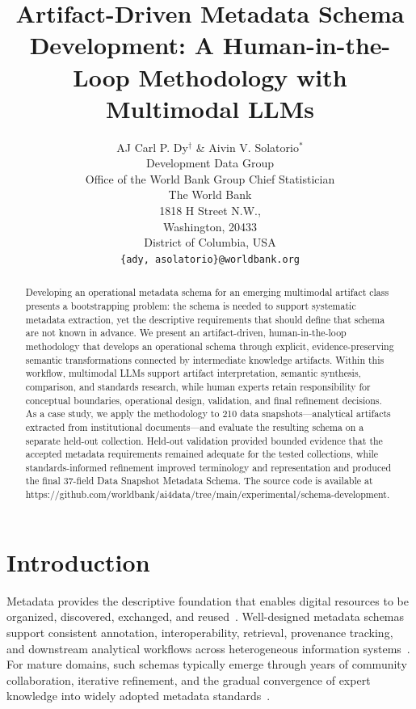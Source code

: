 \documentclass{article}
\title{Artifact-Driven Metadata Schema Development: A Human-in-the-Loop Methodology with Multimodal LLMs}
\author{AJ Carl P. Dy$^{\dagger}$ \& Aivin V. Solatorio$^{*}$ \\
Development Data Group \\
Office of the World Bank Group Chief Statistician \\
The World Bank \\
1818 H Street N.W., \\
Washington, 20433 \\
District of Columbia, USA \\
\texttt{\{ady, asolatorio\}@worldbank.org} }
\begin{document}
\maketitle

\begingroup
\renewcommand\thefootnote{\fnsymbol{footnote}}
\endgroup

\begin{abstract}

Developing an operational metadata schema for an emerging multimodal artifact class presents a bootstrapping problem: the schema is needed to support systematic metadata extraction, yet the descriptive requirements that should define that schema are not known in advance. We present an artifact-driven, human-in-the-loop methodology that develops an operational schema through explicit, evidence-preserving semantic transformations connected by intermediate knowledge artifacts. Within this workflow, multimodal LLMs support artifact interpretation, semantic synthesis, comparison, and standards research, while human experts retain responsibility for conceptual boundaries, operational design, validation, and final refinement decisions. As a case study, we apply the methodology to 210 data snapshots---analytical artifacts extracted from institutional documents---and evaluate the resulting schema on a separate held-out collection. Held-out validation provided bounded evidence that the accepted metadata requirements remained adequate for the tested collections, while standards-informed refinement improved terminology and representation and produced the final 37-field Data Snapshot Metadata Schema. The source code is available at https://github.com/worldbank/ai4data/tree/main/experimental/schema-development.

\end{abstract}

\section{Introduction}

Metadata provides the descriptive foundation that enables digital resources to be organized, discovered, exchanged, and reused~\citep{gilliland2008}. Well-designed metadata schemas support consistent annotation, interoperability, retrieval, provenance tracking, and downstream analytical workflows across heterogeneous information systems~\citep{metadatainteroperability2006}. For mature domains, such schemas typically emerge through years of community collaboration, iterative refinement, and the gradual convergence of expert knowledge into widely adopted metadata standards~\citep{caplan2003}.
\end{document}
